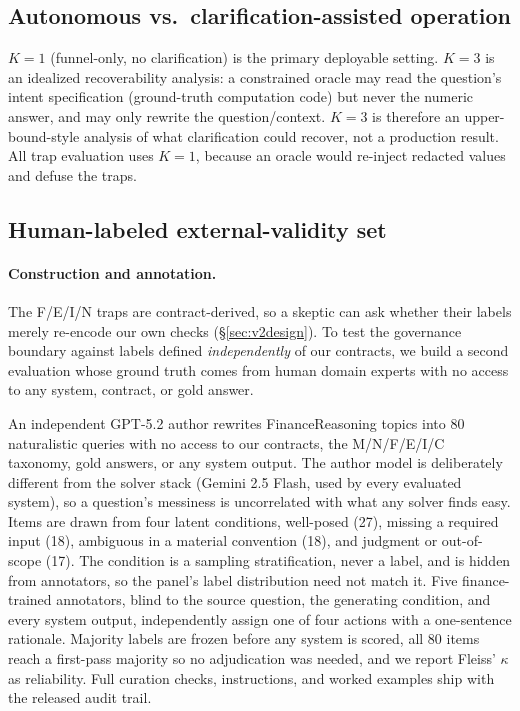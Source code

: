 \documentclass[sigconf,anonymous]{acmart}
\begin{document}
\subsection{Autonomous vs.\ clarification-assisted operation}
$K{=}1$ (funnel-only, no clarification) is the primary deployable setting.
$K{=}3$ is an idealized recoverability analysis: a constrained oracle may read the question's intent specification (ground-truth computation code) but never the numeric answer, and may only rewrite the question/context.
$K{=}3$ is therefore an upper-bound-style analysis of what clarification could recover, not a production result. All trap evaluation uses $K{=}1$, because an oracle would re-inject redacted values and defuse the traps.

\subsection{Human-labeled external-validity set}\label{sec:v2ext}

\paragraph{Construction and annotation.}
The F/E/I/N traps are contract-derived, so a skeptic can ask whether their labels merely re-encode our own checks (\S\ref{sec:v2design}).
To test the governance boundary against labels defined \emph{independently} of our contracts, we build a second evaluation whose ground truth comes from human domain experts with no access to any system, contract, or gold answer.


An independent GPT-5.2 author rewrites FinanceReasoning topics into 80 naturalistic queries with no access to our contracts, the M/N/F/E/I/C taxonomy, gold answers, or any system output. The author model is deliberately different from the solver stack (Gemini 2.5 Flash, used by every evaluated system), so a question's messiness is uncorrelated with what any solver finds easy. Items are drawn from four latent conditions, well-posed (27), missing a required input (18), ambiguous in a material convention (18), and judgment or out-of-scope (17). The condition is a sampling stratification, never a label, and is hidden from annotators, so the panel's label distribution need not match it. Five finance-trained annotators, blind to the source question, the generating condition, and every system output, independently assign one of four actions with a one-sentence rationale. Majority labels are frozen before any system is scored, all 80 items reach a first-pass majority so no adjudication was needed, and we report Fleiss' $\kappa$ as reliability. Full curation checks, instructions, and worked examples ship with the released audit trail.
\end{document}
